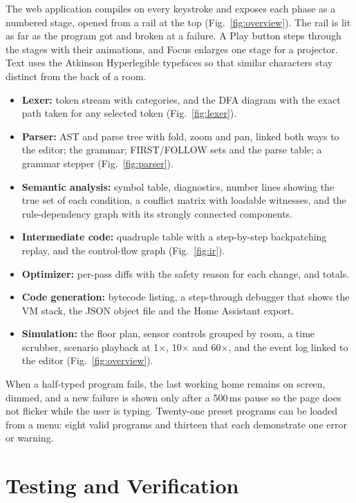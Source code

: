 \documentclass[conference]{IEEEtran}
\begin{document}
The web application compiles on every keystroke and exposes each phase as a numbered stage, opened from a rail at the top (Fig.~\ref{fig:overview}). The rail is lit as far as the program got and broken at a failure. A Play button steps through the stages with their animations, and Focus enlarges one stage for a projector. Text uses the Atkinson Hyperlegible typefaces so that similar characters stay distinct from the back of a room.

\begin{itemize}
  \item \textbf{Lexer:} token stream with categories, and the DFA diagram with the exact path taken for any selected token (Fig.~\ref{fig:lexer}).
  \item \textbf{Parser:} AST and parse tree with fold, zoom and pan, linked both ways to the editor; the grammar; FIRST/FOLLOW sets and the parse table; a grammar stepper (Fig.~\ref{fig:parser}).
  \item \textbf{Semantic analysis:} symbol table, diagnostics, number lines showing the true set of each condition, a conflict matrix with loadable witnesses, and the rule-dependency graph with its strongly connected components.
  \item \textbf{Intermediate code:} quadruple table with a step-by-step backpatching replay, and the control-flow graph (Fig.~\ref{fig:ir}).
  \item \textbf{Optimizer:} per-pass diffs with the safety reason for each change, and totals.
  \item \textbf{Code generation:} bytecode listing, a step-through debugger that shows the VM stack, the JSON object file and the Home Assistant export.
  \item \textbf{Simulation:} the floor plan, sensor controls grouped by room, a time scrubber, scenario playback at 1$\times$, 10$\times$ and 60$\times$, and the event log linked to the editor (Fig.~\ref{fig:overview}).
\end{itemize}

When a half-typed program fails, the last working home remains on screen, dimmed, and a new failure is shown only after a 500\,ms pause so the page does not flicker while the user is typing. Twenty-one preset programs can be loaded from a menu: eight valid programs and thirteen that each demonstrate one error or warning.

\section{Testing and Verification}\label{sec:testing}
\end{document}
